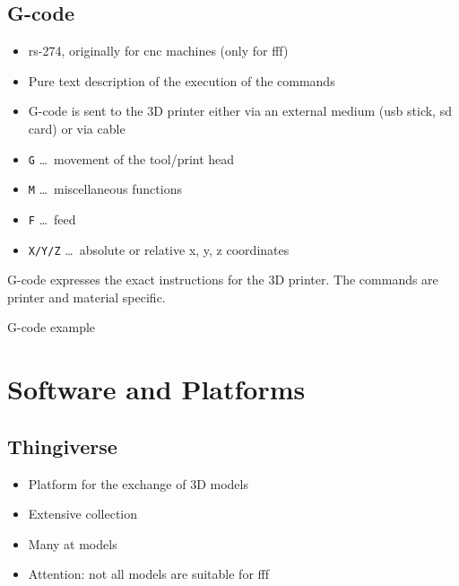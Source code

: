 \documentclass[aspectratio=169]{beamer}
\begin{document}
\subsection{G-code}
\begin{frame}
    \begin{itemize}
        \item \acs{rs}-274, originally for \acs{cnc} machines (only for \acs{fff})
        \item Pure text description of the execution of the commands
        \item G-code is sent to the 3D printer either via an external medium (\acs{usb} stick, \acs{sd} card) or via cable
        \item \texttt{G} \ldots\, movement of the tool/print head
        \item \texttt{M} \ldots\, miscellaneous functions
        \item \texttt{F} \ldots\, feed
        \item \texttt{X/Y/Z} \ldots\, absolute or relative x, y, z coordinates
    \end{itemize}
    \begin{exampleblock}{}
        G-code expresses the exact instructions for the 3D printer.
        The commands are printer and material specific.
    \end{exampleblock}
\end{frame}

\begin{frame}
    \begin{listing}[H]
        \caption{G-code example}
        \label{lst:gcode:example}
    \end{listing}
\end{frame}

\section{Software and Platforms}

\subsection{Thingiverse}
\begin{frame}
    \begin{itemize}
        \item Platform for the exchange of 3D models
        \item Extensive collection
        \item Many \acs{at} models
        \item Attention: not all models are suitable for \acs{fff}
    \end{itemize}
\end{frame}
\end{document}
